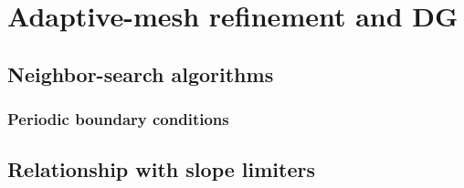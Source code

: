 \section{Adaptive-mesh refinement and DG}
\subsection{Neighbor-search algorithms}
\subsubsection{Periodic boundary conditions}
\subsection{Relationship with slope limiters}